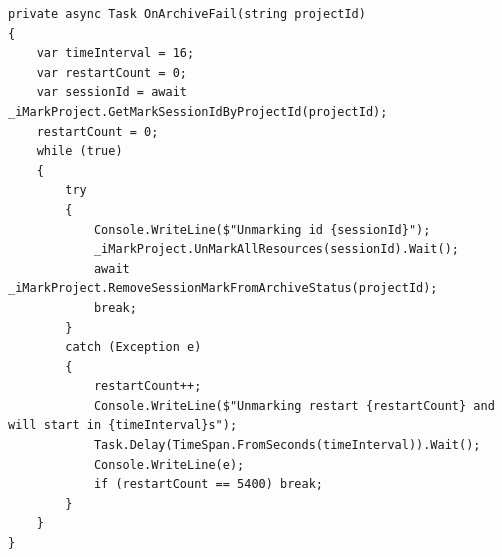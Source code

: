 \begin{lstlisting}[language={[Sharp]C}, caption={Unmarking retry implementation}, captionpos=b,label={lst:unmarkRetry}]
private async Task OnArchiveFail(string projectId)
{
    var timeInterval = 16;
    var restartCount = 0;
    var sessionId = await _iMarkProject.GetMarkSessionIdByProjectId(projectId);
    restartCount = 0;
    while (true)
    {
        try
        {
            Console.WriteLine($"Unmarking id {sessionId}");
            _iMarkProject.UnMarkAllResources(sessionId).Wait();
            await _iMarkProject.RemoveSessionMarkFromArchiveStatus(projectId);
            break;
        }
        catch (Exception e)
        {
            restartCount++;
            Console.WriteLine($"Unmarking restart {restartCount} and will start in {timeInterval}s");
            Task.Delay(TimeSpan.FromSeconds(timeInterval)).Wait();
            Console.WriteLine(e);
            if (restartCount == 5400) break;
        }
    }
}
\end{lstlisting}
